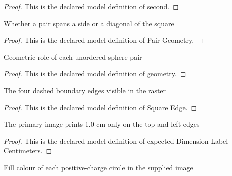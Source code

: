 \begin{proof}
  This is the declared model definition of second.
\end{proof}
\begin{definition}
  \label{def:physics:phyx-mini-0864:phyxminiproblems-problemphyxmini0864-pairgeometry}
  Whether a pair spans a side or a diagonal of the square
\end{definition}
\begin{proof}
  This is the declared model definition of Pair Geometry.
\end{proof}
\begin{definition}[geometry]
  \label{def:physics:phyx-mini-0864:phyxminiproblems-problemphyxmini0864-spherepair-geometry}
  Geometric role of each unordered sphere pair
\end{definition}
\begin{proof}
  This is the declared model definition of geometry.
\end{proof}
\begin{definition}
  \label{def:physics:phyx-mini-0864:phyxminiproblems-problemphyxmini0864-squareedge}
  The four dashed boundary edges visible in the raster
\end{definition}
\begin{proof}
  This is the declared model definition of Square Edge.
\end{proof}
\begin{definition}
  \label{def:physics:phyx-mini-0864:phyxminiproblems-problemphyxmini0864-expecteddimensionlabelcentimeters}
  The primary image prints 1.0 cm only on the top and left edges
\end{definition}
\begin{proof}
  This is the declared model definition of expected Dimension Label Centimeters.
\end{proof}
\begin{definition}
  \label{def:physics:phyx-mini-0864:phyxminiproblems-problemphyxmini0864-chargecirclecolor}
  Fill colour of each positive-charge circle in the supplied image
\end{definition}
